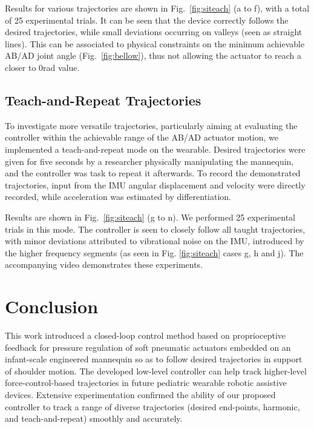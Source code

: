 \documentclass[letterpaper, 10pt, conference]{ieeeconf}      %
\begin{document}
Results for various trajectories are shown in Fig.~\ref{fig:siteach} (a to f), with a total of 25 experimental trials. It can be seen that the device correctly follows the desired trajectories, while small deviations occurring on valleys (seen as straight lines). This can be associated to physical constraints on the minimum achievable AB/AD joint angle (Fig.~\ref{fig:bellow}), thus not allowing the actuator to reach a closer to $0$\;rad value. %

\subsection{Teach-and-Repeat Trajectories}
To investigate more versatile trajectories, particularly aiming at evaluating the controller within the achievable range of the AB/AD actuator motion, we implemented a teach-and-repeat mode on the wearable. Desired trajectories were given for five seconds by a researcher physically manipulating the mannequin, and the controller was task to repeat it afterwards. To record the demonstrated trajectories, input from the IMU angular displacement and velocity were directly recorded, while acceleration was estimated by differentiation.


Results are shown in Fig.~\ref{fig:siteach} (g to n). We performed 25 experimental trials in this mode. The controller is seen to closely follow all taught trajectories, with minor deviations attributed to vibrational noise on the IMU, introduced by the higher frequency segments (as seen in Fig. \ref{fig:siteach} cases g, h and j). The accompanying video demonstrates these experiments.


   



\section{Conclusion}
\label{sec:conclusion}

This work introduced a closed-loop control method based on proprioceptive feedback for pressure regulation of soft pneumatic actuators embedded on an infant-scale engineered mannequin so as to follow desired trajectories in support of shoulder motion. The developed low-level controller can help track higher-level force-control-based trajectories in future pediatric wearable robotic assistive devices. 
%
Extensive experimentation confirmed the ability of our proposed controller to track a range of diverse trajectories (desired end-points, harmonic, and teach-and-repeat) smoothly and accurately.
\end{document}
